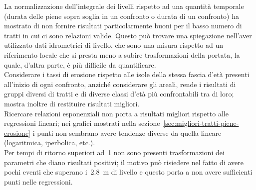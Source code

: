 La normalizzazione dell'integrale dei livelli rispetto ad una quantità temporale (durata delle piene sopra soglia in un confronto o durata di un confronto) ha mostrato di non fornire risultati particolarmente buoni per il basso numero di tratti in cui ci sono relazioni valide. Questo può trovare una spiegazione nell'aver utilizzato dati idrometrici di livello, che sono una misura rispetto ad un riferimento locale che si presta meno a subire trasformazioni della portata, la quale, d'altra parte, è più difficile da quantificare.
\\
Considerare i tassi di erosione rispetto alle isole della stessa fascia d'età presenti all'inizio di ogni confronto, anziché considerare gli areali, rende i risultati di gruppi diversi di tratti e di diverse classi d'età più confrontabili tra di loro; mostra inoltre di restituire risultati migliori.
\\
Ricercare relazioni esponenziali non porta a risultati migliori rispetto alle regressioni lineari; nei grafici mostrati nella sezione~\ref{sec:migliori-tratti-piene-erosione} i punti non sembrano avere tendenze diverse da quella lineare (logaritmica, iperbolica, etc.).
\\
Per tempi di ritorno superiori ad~\SI{1}{\anno} non sono presenti trasformazioni dei parametri che diano risultati positivi; il motivo può risiedere nel fatto di avere pochi eventi che superano i~\SI{2.8}{\m} di livello e questo porta a non avere sufficienti punti nelle regressioni.
